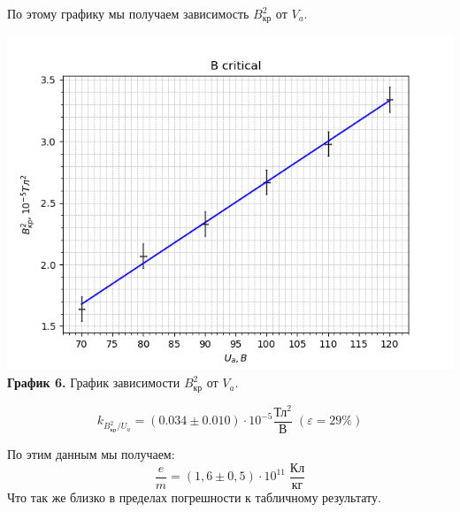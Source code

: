 \documentclass[a4paper, 12pt]{article}
\begin{document}
По этому графику мы получаем зависимость $B_{\text{кр}}^2$ от $V_a$.

\begin{center}
\includegraphics[width = \textwidth]{data/magnet/graphs/B_critical.png}\\
\textbf{График 6.} График зависимости $B_{\text{кр}}^2$ от $V_a$.
\end{center}

\begin{equation}
    k_{B_{\text{кр}}^2/U_a} = (0.034 \pm 0.010) \cdot 10^{-5} \frac{\text{Тл}^2}{\text{В}} \; (\varepsilon = 29 \%)
\end{equation}

По этим данным мы получаем:
\begin{equation}
    \dfrac{e}{m} = (1,6 \pm 0,5) \cdot 10^{11} \; \frac{\text{Кл}}{\text{кг}}
\end{equation}
Что так же близко в пределах погрешности к табличному результату.
\end{document}
